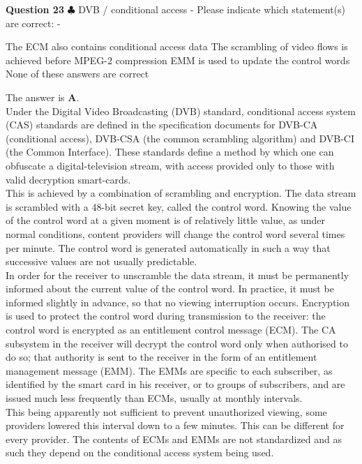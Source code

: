 \documentclass[en]{sourcefiles/eplexam}
\newcounter{choice}
\renewcommand\thechoice{\textbf{\Alph{choice}}}
\newcommand\choicelabel{\thechoice$\quad$}
\newenvironment{choices}%
  {\list{\choicelabel}%
     {\usecounter{choice}\def\makelabel##1{\hss\llap{##1}}%
       \settowidth{\leftmargin}{W.\hskip\labelsep\hskip 2.5em}%
       \def\choice{%
         \item
       } %
       \labelwidth\leftmargin\advance\labelwidth-\labelsep
       \topsep=0pt
       \partopsep=0pt
     }%
  }%
  {\endlist}
\begin{document}
\textbf{Question 23} $\clubsuit$ DVB / conditional access - Please indicate which statement(s) are correct:
\begin{choices}
    \choice The ECM also contains conditional access data
    \choice The scrambling of video flows is achieved before MPEG-2 compression
    \choice EMM is used to update the control words
     \choice None of these answers are correct
\end{choices}
\begin{solution}
The answer is \textbf{A}.\\

\noindent Under the Digital Video Broadcasting (DVB) standard, conditional access system (CAS) standards are defined in the specification documents for DVB-CA (conditional access), DVB-CSA (the common scrambling algorithm) and DVB-CI (the Common Interface). These standards define a method by which one can obfuscate a digital-television stream, with access provided only to those with valid decryption smart-cards.\\

\noindent This is achieved by a combination of scrambling and encryption. The data stream is scrambled with a 48-bit secret key, called the control word. Knowing the value of the control word at a given moment is of relatively little value, as under normal conditions, content providers will change the control word several times per minute. The control word is generated automatically in such a way that successive values are not usually predictable.\\

\noindent In order for the receiver to unscramble the data stream, it must be permanently informed about the current value of the control word. In practice, it must be informed slightly in advance, so that no viewing interruption occurs. Encryption is used to protect the control word during transmission to the receiver: the control word is encrypted as an entitlement control message (ECM). The CA subsystem in the receiver will decrypt the control word only when authorised to do so; that authority is sent to the receiver in the form of an entitlement management message (EMM). The EMMs are specific to each subscriber, as identified by the smart card in his receiver, or to groups of subscribers, and are issued much less frequently than ECMs, usually at monthly intervals.\\
This being apparently not sufficient to prevent unauthorized viewing, some providers lowered this interval down to a few minutes. This can be different for every provider. The contents of ECMs and EMMs are not standardized and as such they depend on the conditional access system being used.\\


\end{solution}
\end{document}
